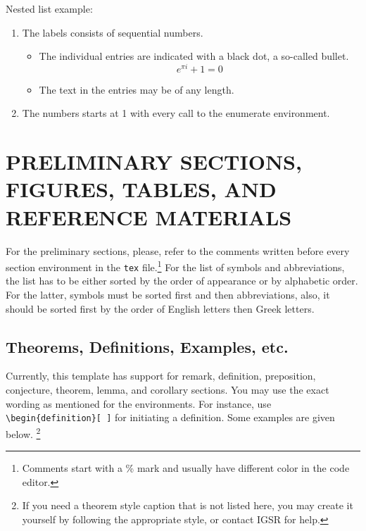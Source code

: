 \documentclass[a4paper,12pt,oneside]{report}
\begin{document}
Nested list example:\noskip

\begin{enumerate}
   \item The labels consists of sequential numbers.
   \begin{itemize}
     \item The individual entries are indicated with a black dot, a so-called bullet.
        \begin{equation} \label{eu_eqn_itemize}
          e^{\pi i} + 1 = 0
        \end{equation}
     \item The text in the entries may be of any length.
   \end{itemize}
   \item The numbers starts at 1 with every call to the enumerate environment.
\end{enumerate}


\chapter{PRELIMINARY SECTIONS, FIGURES, TABLES, AND REFERENCE MATERIALS}\label{ch:preliminary}
For the preliminary sections, please, refer to the comments written before every section environment in the \texttt{tex} file.\footnote{Comments start with a \% mark and usually have different color in the code editor.} For the list of symbols and abbreviations, the list has to be either sorted by the order of appearance or by alphabetic order. For the latter, symbols must be sorted first and then abbreviations, also, it should be sorted first by the order of English letters then Greek letters.

\section{Theorems, Definitions, Examples, etc.}\label{sec:theorems}
Currently, this template has support for remark, definition, preposition, conjecture, theorem, lemma, and corollary sections. You may use the exact wording as mentioned for the environments. For instance, use \texttt{\textbackslash{begin\{definition\}[ ]}} for initiating a definition. Some examples are given below. \footnote{If you need a theorem style caption that is not listed here, you may create it yourself by following the appropriate style, or contact IGSR for help.}
\end{document}

